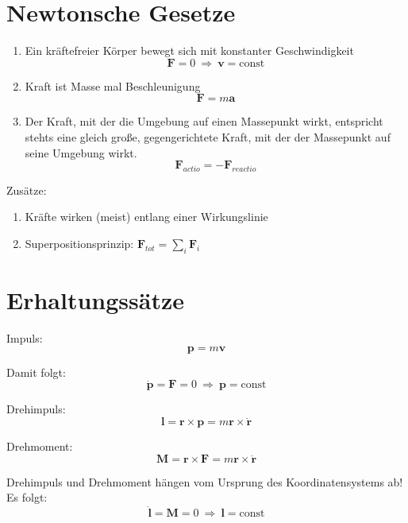 \begin{frameddefn}[Koordinatendarstellungen]
\end{frameddefn}



\section{Newtonsche Gesetze}

\begin{frameddefn}
	\begin{enumerate}
		\item Ein kräftefreier Körper bewegt sich mit konstanter Geschwindigkeit \[\mathbf{F} = 0 \ \Rightarrow\  \mathbf{v} = \textrm{const}\]
		\item Kraft ist Masse mal Beschleunigung \[\mathbf{F} = m \mathbf{a}\]
		\item Der Kraft, mit der die Umgebung auf einen Massepunkt wirkt, entspricht stehts eine gleich große, gegengerichtete Kraft, mit der der Massepunkt auf seine Umgebung wirkt. \[\mathbf{F}_{actio} = -\mathbf{F}_{reactio}\]
	\end{enumerate}
	
	Zusätze:
	\begin{enumerate}
		\item Kräfte wirken (meist) entlang einer Wirkungslinie
		\item Superpositionsprinzip: $\mathbf{F}_{tot} = \sum_i \mathbf{F}_i$
	\end{enumerate}
\end{frameddefn}


\section{Erhaltungssätze}

\begin{frameddefn}[Impulserhaltung]
	Impuls: \[\mathbf{p} = m \mathbf{v}\]
	
	Damit folgt: \[\mathbf{\dot{p}} = \mathbf{F} = 0 \ \Rightarrow\ \mathbf{p} = \textrm{const}\]
	
\end{frameddefn}

\begin{frameddefn}[Drehimpulserhaltung]
	Drehimpuls:
	\[ \mathbf{l} = \mathbf{r} \times \mathbf{p} = m \mathbf{r} \times \mathbf{\dot{r}}\]
	
	Drehmoment:
	\[ \mathbf{M} = \mathbf{r} \times \mathbf{F} = m \mathbf{r} \times \mathbf{\ddot{r}} \]
	
	Drehimpuls und Drehmoment hängen vom Ursprung des Koordinatensystems ab!
	Es folgt:
	\[ \mathbf{\dot{l}} = \mathbf{M} = 0 \ \Rightarrow \ \mathbf{l} = \textrm{const} \]
\end{frameddefn}

